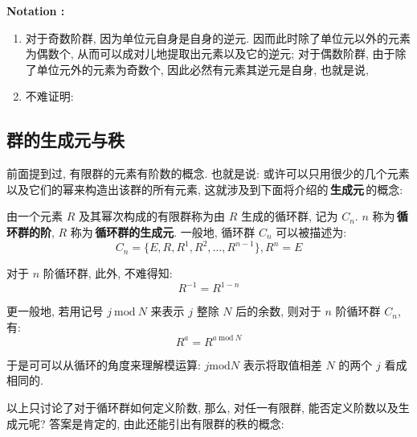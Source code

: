         \textbf{Notation :}
        \begin{enumerate}
            \item 对于奇数阶群, 因为单位元自身是自身的逆元. 因而此时除了单位元以外的元素为偶数个, 从而可以成对儿地提取出元素以及它的逆元; 对于偶数阶群, 由于除了单位元外的元素为奇数个, 因此必然有元素其逆元是自身, 也就是说, 
            \item 不难证明: 
        \end{enumerate}

    \subsection{群的生成元与秩}
        \hspace*{2em}前面提到过, 有限群的元素有阶数的概念. 也就是说: 或许可以只用很少的几个元素以及它们的幂来构造出该群的所有元素, 这就涉及到下面将介绍的\,\textbf{生成元}\,的概念:

            \begin{Definition}[循环群与生成元]
                由一个元素 $R$ 及其幂次构成的有限群称为由 $R$ 生成的循环群, 记为 $C_n$. $n$ 称为\,\textbf{循环群的阶}, $R$ 称为\,\textbf{循环群的生成元}. 一般地, 循环群 $C_n$ 可以被描述为:
                    \begin{equation}
                        C_n = \{E, R, R^{1}, R^{2}, \dots , R^{n-1}\}, R^{n} = E
                    \end{equation}
            \end{Definition}

        对于 $n$ 阶循环群,  此外, 不难得知:
            \begin{equation}
                R^{-1} = R^{1-n}
            \end{equation}

        更一般地, 若用记号 $j\ \mathrm{mod}\ N$ 来表示 $j$ 整除 $N$ 后的余数, 则对于 $n$ 阶循环群 $C_n$, 有:
            \begin{equation}
                R^{a} = R^{a\ \mathrm{mod}\ N}
            \end{equation}

        于是可可以从循环的角度来理解模运算: $j \mathrm{mod} N$ 表示将取值相差 $N$ 的两个 $j$ 看成相同的.

        \hspace*{2em}以上只讨论了对于循环群如何定义阶数, 那么, 对任一有限群, 能否定义阶数以及生成元呢? 答案是肯定的, 由此还能引出有限群的秩的概念:

